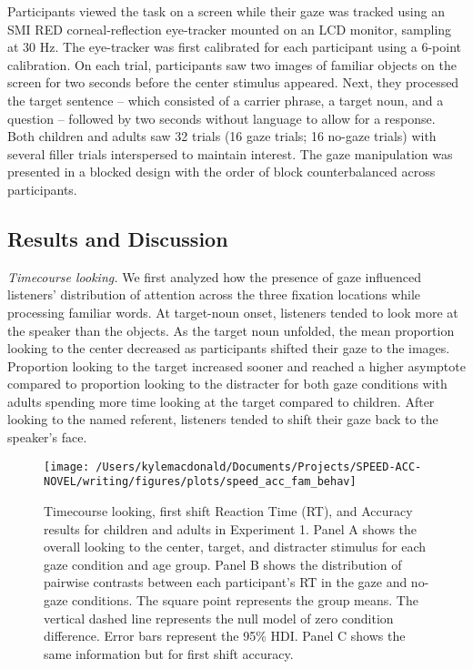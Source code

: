 \documentclass[man,floatsintext]{apa6}
\begin{document}
Participants viewed the task on a screen while their gaze was tracked
using an SMI RED corneal-reflection eye-tracker mounted on an LCD
monitor, sampling at 30 Hz. The eye-tracker was first calibrated for
each participant using a 6-point calibration. On each trial,
participants saw two images of familiar objects on the screen for two
seconds before the center stimulus appeared. Next, they processed the
target sentence -- which consisted of a carrier phrase, a target noun,
and a question -- followed by two seconds without language to allow for
a response. Both children and adults saw 32 trials (16 gaze trials; 16
no-gaze trials) with several filler trials interspersed to maintain
interest. The gaze manipulation was presented in a blocked design with
the order of block counterbalanced across participants.

\subsection{Results and Discussion}\label{results-and-discussion}

\emph{Timecourse looking.} We first analyzed how the presence of gaze
influenced listeners' distribution of attention across the three
fixation locations while processing familiar words. At target-noun
onset, listeners tended to look more at the speaker than the objects. As
the target noun unfolded, the mean proportion looking to the center
decreased as participants shifted their gaze to the images. Proportion
looking to the target increased sooner and reached a higher asymptote
compared to proportion looking to the distracter for both gaze
conditions with adults spending more time looking at the target compared
to children. After looking to the named referent, listeners tended to
shift their gaze back to the speaker's face.

\begin{figure}[!t]

{\centering \texttt{[image: /Users/kylemacdonald/Documents/Projects/SPEED-ACC-NOVEL/writing/figures/plots/speed\_acc\_fam\_behav]} 

}

\caption{Timecourse looking, first shift Reaction Time (RT), and Accuracy results for children and adults in Experiment 1. Panel A shows the overall looking to the center, target, and distracter stimulus for each gaze condition and age group. Panel B shows the distribution of pairwise contrasts between each participant's RT in the gaze and no-gaze conditions. The square point represents the group means. The vertical dashed line represents the null model of zero condition difference. Error bars represent the 95\% HDI. Panel C shows the same information but for first shift accuracy.}\label{fig:speed-acc-gaze-results}
\end{figure}
\end{document}
